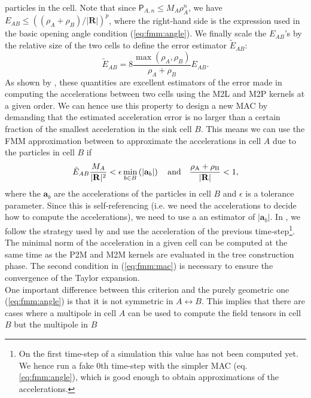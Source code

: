 particles in the cell. Note that since $\mathsf{P}_{A,n} \leq M_A
\rho_A^n$, we have $E_{AB} \leq \left((\rho_A +
\rho_B)/|\mathbf{R}|\right)^p$, where the right-hand side is the expression
used in the basic opening angle condition (\ref{eq:fmm:angle}). We finally
scale the $E_{AB}$'s by the relative size of the two cells to define the
error estimator $\tilde{E}_{AB}$:
\begin{equation}
  \tilde{E}_{AB} = 8\frac{\max(\rho_A, \rho_B)}{\rho_A + \rho_B}E_{AB}.
  \label{eq:fmm:e_ab_tilde}
\end{equation}
As shown by \cite{Dehnen2014}, these quantities are excellent estimators of
the error made in computing the accelerations between two cells using the
M2L and M2P kernels at a given order. We can hence use this property to
design a new MAC by demanding that the estimated acceleration error is no
larger than a certain fraction of the smallest acceleration in the sink
cell $B$. This means we can use the FMM approximation between to
approximate the accelerations in cell $A$ due to the particles in cell $B$ if
\begin{equation}
  \tilde{E}_{AB} \frac{M_A}{|\mathbf{R}|^2} < \epsilon \min_{b\in
    B}\left(|\mathbf{a}_b|\right) \quad \rm{and} \quad \frac{\rho_A +
    \rho_B} {|\mathbf{R}|} < 1,
  \label{eq:fmm:mac}  
\end{equation}
where the $\mathbf{a}_b$ are the accelerations of the particles in cell $B$
and $\epsilon$ is a tolerance parameter. Since this is self-referencing
(i.e. we need the accelerations to decide how to compute the
accelerations), we need to use a an estimator of $|\mathbf{a}_b|$. In
\swift, we follow the strategy used by \gadget and use the acceleration of
the previous time-step\footnote{On the first time-step of a simulation this
  value has not been computed yet. We hence run a fake 0th time-step with
  the simpler MAC (eq. \ref{eq:fmm:angle}), which is good enough to obtain
  approximations of the accelerations.}. The minimal norm of the
acceleration in a given cell can be computed at the same time as the P2M
and M2M kernels are evaluated in the tree construction phase. The second
condition in (\ref{eq:fmm:mac}) is necessary to ensure the convergence of the
Taylor expansion.\\
One important difference between this criterion and the purely geometric
one (\ref{eq:fmm:angle}) is that it is not symmetric in $A \leftrightarrow
B$. This implies that there are cases where a multipole in cell $A$ can be
used to compute the field tensors in cell $B$ but the multipole in $B$
